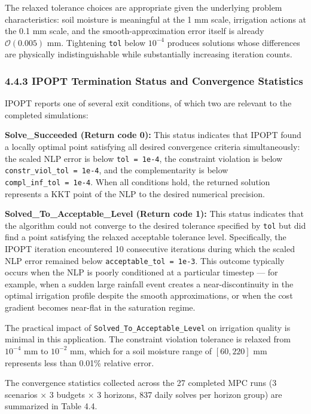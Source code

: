 The relaxed tolerance choices are appropriate given the underlying
problem characteristics: soil moisture is meaningful at the 1 mm scale,
irrigation actions at the 0.1 mm scale, and the smooth-approximation
error itself is already \(\mathcal{O}(0.005)\) mm. Tightening
\texttt{tol} below \(10^{-4}\) produces solutions whose differences are
physically indistinguishable while substantially increasing iteration
counts.

\subsubsection{4.4.3 IPOPT Termination Status and Convergence
Statistics}\label{ipopt-termination-status-and-convergence-statistics}

IPOPT reports one of several exit conditions, of which two are relevant
to the completed simulations:

\textbf{Solve\_Succeeded (Return code 0):} This status indicates that
IPOPT found a locally optimal point satisfying all desired convergence
criteria simultaneously: the scaled NLP error is below
\texttt{tol\ =\ 1e-4}, the constraint violation is below
\texttt{constr\_viol\_tol\ =\ 1e-4}, and the complementarity is below
\texttt{compl\_inf\_tol\ =\ 1e-4}. When all conditions hold, the
returned solution represents a KKT point of the NLP to the desired
numerical precision.

\textbf{Solved\_To\_Acceptable\_Level (Return code 1):} This status
indicates that the algorithm could not converge to the desired tolerance
specified by \texttt{tol} but did find a point satisfying the relaxed
acceptable tolerance level. Specifically, the IPOPT iteration
encountered 10 consecutive iterations during which the scaled NLP error
remained below \texttt{acceptable\_tol\ =\ 1e-3}. This outcome typically
occurs when the NLP is poorly conditioned at a particular timestep ---
for example, when a sudden large rainfall event creates a
near-discontinuity in the optimal irrigation profile despite the smooth
approximations, or when the cost gradient becomes near-flat in the
saturation regime.

The practical impact of \texttt{Solved\_To\_Acceptable\_Level} on
irrigation quality is minimal in this application. The constraint
violation tolerance is relaxed from \(10^{-4}\) mm to \(10^{-2}\) mm,
which for a soil moisture range of \([60, 220]\) mm represents less than
0.01\% relative error.

The convergence statistics collected across the 27 completed MPC runs (3
scenarios × 3 budgets × 3 horizons, 837 daily solves per horizon group)
are summarized in Table 4.4.

